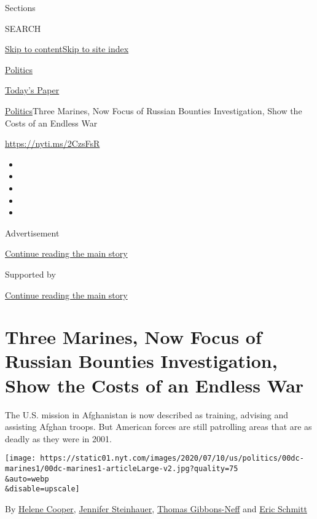 Sections

SEARCH

\protect\hyperlink{site-content}{Skip to
content}\protect\hyperlink{site-index}{Skip to site index}

\href{https://www.nytimes.com/section/politics}{Politics}

\href{https://myaccount.nytimes.com/auth/login?response_type=cookie\&client_id=vi}{}

\href{https://www.nytimes.com/section/todayspaper}{Today's Paper}

\href{/section/politics}{Politics}\textbar{}Three Marines, Now Focus of
Russian Bounties Investigation, Show the Costs of an Endless War

\url{https://nyti.ms/2CzsFsR}

\begin{itemize}
\item
\item
\item
\item
\item
\end{itemize}

Advertisement

\protect\hyperlink{after-top}{Continue reading the main story}

Supported by

\protect\hyperlink{after-sponsor}{Continue reading the main story}

\hypertarget{three-marines-now-focus-of-russian-bounties-investigation-show-the-costs-of-an-endless-war}{%
\section{Three Marines, Now Focus of Russian Bounties Investigation,
Show the Costs of an Endless
War}\label{three-marines-now-focus-of-russian-bounties-investigation-show-the-costs-of-an-endless-war}}

The U.S. mission in Afghanistan is now described as training, advising
and assisting Afghan troops. But American forces are still patrolling
areas that are as deadly as they were in 2001.

\texttt{[image: https://static01.nyt.com/images/2020/07/10/us/politics/00dc-marines1/00dc-marines1-articleLarge-v2.jpg?quality=75\\\&auto=webp\\\&disable=upscale]}

By \href{https://www.nytimes.com/by/helene-cooper}{Helene Cooper},
\href{https://www.nytimes.com/by/jennifer-steinhauer}{Jennifer
Steinhauer},
\href{https://www.nytimes.com/by/thomas-gibbons-neff}{Thomas
Gibbons-Neff} and \href{https://www.nytimes.com/by/eric-schmitt}{Eric
Schmitt}

